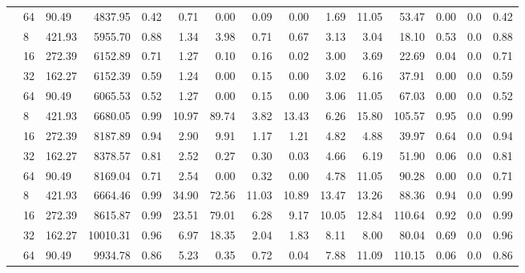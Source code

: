 \begin{table}
\begin{adjustwidth}{-1cm}{}
{\begin{tabular}{lllrrrrrrrrrrrr}
                                & 64 & 90.49  & 4837.95   & 0.42   & 0.71   & 0.00   & 0.09  & 0.00  & 1.69  & 11.05 & 53.47           & 0.00      & 0.0   & 0.42 \\
                        \addlinespace
                        24      & 8  & 421.93 & 5955.70   & 0.88   & 1.34   & 3.98   & 0.71  & 0.67  & 3.13  & 3.04  & 18.10           & 0.53      & 0.0   & 0.88 \\
                                & 16 & 272.39 & 6152.89   & 0.71   & 1.27   & 0.10   & 0.16  & 0.02  & 3.00  & 3.69  & 22.69           & 0.04      & 0.0   & 0.71 \\
                                & 32 & 162.27 & 6152.39   & 0.59   & 1.24   & 0.00   & 0.15  & 0.00  & 3.02  & 6.16  & 37.91           & 0.00      & 0.0   & 0.59 \\
                                & 64 & 90.49  & 6065.53   & 0.52   & 1.27   & 0.00   & 0.15  & 0.00  & 3.06  & 11.05 & 67.03           & 0.00      & 0.0   & 0.52 \\
                        \addlinespace
                        48      & 8  & 421.93 & 6680.05   & 0.99   & 10.97  & 89.74  & 3.82  & 13.43 & 6.26  & 15.80 & 105.57          & 0.95      & 0.0   & 0.99 \\
                                & 16 & 272.39 & 8187.89   & 0.94   & 2.90   & 9.91   & 1.17  & 1.21  & 4.82  & 4.88  & 39.97           & 0.64      & 0.0   & 0.94 \\
                                & 32 & 162.27 & 8378.57   & 0.81   & 2.52   & 0.27   & 0.30  & 0.03  & 4.66  & 6.19  & 51.90           & 0.06      & 0.0   & 0.81 \\
                                & 64 & 90.49  & 8169.04   & 0.71   & 2.54   & 0.00   & 0.32  & 0.00  & 4.78  & 11.05 & 90.28           & 0.00      & 0.0   & 0.71 \\
                        \addlinespace
                        96      & 8  & 421.93 & 6664.46   & 0.99   & 34.90  & 72.56  & 11.03 & 10.89 & 13.47 & 13.26 & 88.36           & 0.94      & 0.0   & 0.99 \\
                                & 16 & 272.39 & 8615.87   & 0.99   & 23.51  & 79.01  & 6.28  & 9.17  & 10.05 & 12.84 & 110.64          & 0.92      & 0.0   & 0.99 \\
                                & 32 & 162.27 & 10010.31  & 0.96   & 6.97   & 18.35  & 2.04  & 1.83  & 8.11  & 8.00  & 80.04           & 0.69      & 0.0   & 0.96 \\
                                & 64 & 90.49  & 9934.78   & 0.86   & 5.23   & 0.35   & 0.72  & 0.04  & 7.88  & 11.09 & 110.15          & 0.06      & 0.0   & 0.86 \\

\end{tabular}}
\end{adjustwidth}
\end{table}
